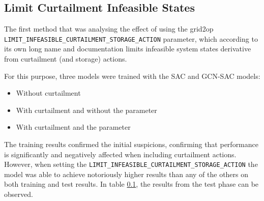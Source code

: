 \subsection{Limit Curtailment Infeasible States}

The first method that was analysing the effect of using the grid2op  \texttt{LIMIT\_INFEASIBLE\_CURTAILMENT\_STORAGE\_ACTION} parameter, which according to its own long name and documentation limits infeasible system states derivative from curtailment (and storage) actions. \par
For this purpose, three models were trained with the SAC and GCN-SAC models: 
\begin{itemize}
	\item Without curtailment
	\item With curtailment and without the parameter
	\item With curtailment and the parameter
\end{itemize}

The training results confirmed the initial suspicions, confirming that performance is significantly and negatively affected when including curtailment actions. However, when setting the \texttt{LIMIT\_INFEASIBLE\_CURTAILMENT\_STORAGE\_ACTION} the model was able to achieve notoriously higher results than any of the others on both training and test results. In table \ref{}, the results from the test phase can be observed.

